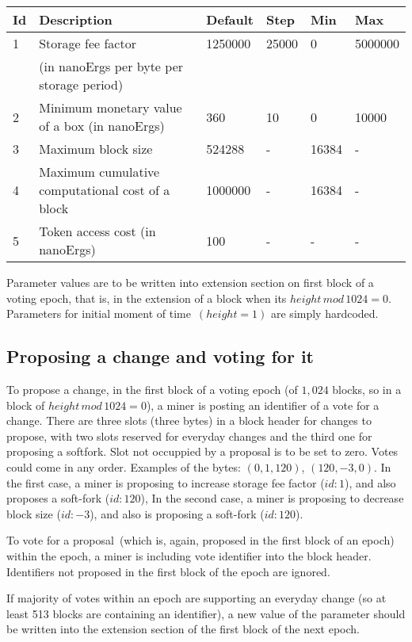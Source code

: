 \begin{tabular}{| l | l | l | l | l | l |}
\hline
Id & Description & Default & Step & Min & Max \\
\hline
\hline
1 & Storage fee factor  & 1250000 & 25000 & 0 & 5000000 \\
  &  (in nanoErgs per byte per storage period) & & & & \\
\hline
2 & Minimum monetary value of a box (in nanoErgs) & 360 & 10 & 0 & 10000 \\
\hline
3 & Maximum block size & 524288 & - & 16384 & - \\
\hline
4 & Maximum cumulative computational cost of a block & 1000000 & - & 16384 & - \\
\hline
5 & Token access cost (in nanoErgs) & 100 & - & - & - \\
\end{tabular}

Parameter values are to be written into extension section on first block of a voting epoch,
that is, in the extension of a block when its $height\,mod\,1024 = 0$.
Parameters for initial moment of time~$(height = 1)$ are simply hardcoded.

\subsection{Proposing a change and voting for it}

To propose a change, in the first block of a voting epoch (of $1,024$ blocks, so in a block of
$height\,mod\,1024 = 0$), a miner is posting an identifier of a vote for a change. There are three slots (three bytes)
in a block header for changes to propose, with two slots reserved for everyday changes and the third one for
proposing a softfork. Slot not occuppied by a proposal is to be set to zero. Votes could come in any order.
Examples of the bytes: $(0, 1, 120)$, $(120, -3, 0)$. In the first case, a miner is proposing to increase storage fee factor ($id:1$), and
also proposes a soft-fork ($id:120$), In the second case, a miner is proposing to decrease block size ($id:-3$), and also
 is proposing a soft-fork ($id:120$).

To vote for a proposal~(which is, again, proposed in the first block of an epoch) within the epoch, a miner is including vote identifier
into the block header. Identifiers not proposed in the first block of the epoch are ignored.

If majority of votes within an epoch are supporting an everyday change (so at least 513 blocks are containing an
identifier), a new value of the parameter should be written into the extension section of the first block of the next
epoch.


